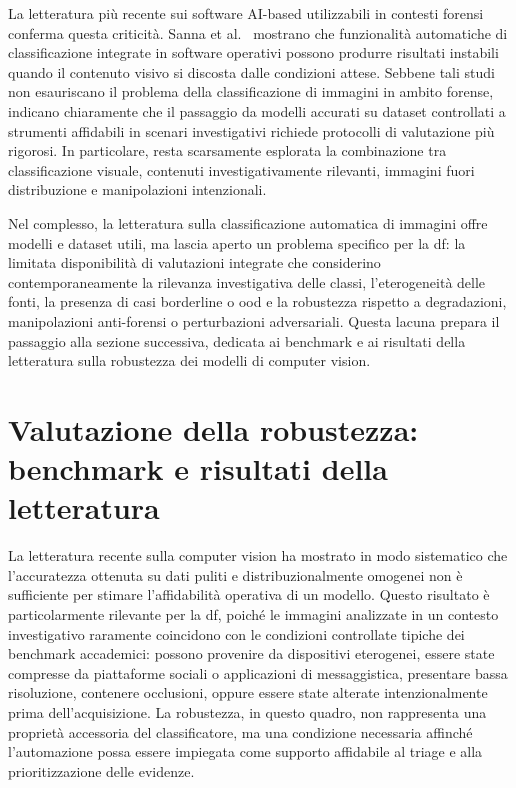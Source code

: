 La letteratura più recente sui software AI-based utilizzabili in contesti forensi conferma questa criticità. Sanna et al.~\cite{sanna2024preliminary} mostrano che funzionalità automatiche di classificazione integrate in software operativi possono produrre risultati instabili quando il contenuto visivo si discosta dalle condizioni attese. Sebbene tali studi non esauriscano il problema della classificazione di immagini in ambito forense, indicano chiaramente che il passaggio da modelli accurati su dataset controllati a strumenti affidabili in scenari investigativi richiede protocolli di valutazione più rigorosi. In particolare, resta scarsamente esplorata la combinazione tra classificazione visuale, contenuti investigativamente rilevanti, immagini fuori distribuzione e manipolazioni intenzionali.

Nel complesso, la letteratura sulla classificazione automatica di immagini offre modelli e dataset utili, ma lascia aperto un problema specifico per la \gls{df}: la limitata disponibilità di valutazioni integrate che considerino contemporaneamente la rilevanza investigativa delle classi, l'eterogeneità delle fonti, la presenza di casi borderline o \gls{ood} e la robustezza rispetto a degradazioni, manipolazioni anti-forensi o perturbazioni adversariali. Questa lacuna prepara il passaggio alla sezione successiva, dedicata ai benchmark e ai risultati della letteratura sulla robustezza dei modelli di computer vision.

\section{Valutazione della robustezza: benchmark e risultati della letteratura}
\label{sec:sota-robustness-benchmarks}

La letteratura recente sulla computer vision ha mostrato in modo sistematico che l'accuratezza ottenuta su dati puliti e distribuzionalmente omogenei non è sufficiente per stimare l'affidabilità operativa di un modello. Questo risultato è particolarmente rilevante per la \gls{df}, poiché le immagini analizzate in un contesto investigativo raramente coincidono con le condizioni controllate tipiche dei benchmark accademici: possono provenire da dispositivi eterogenei, essere state compresse da piattaforme sociali o applicazioni di messaggistica, presentare bassa risoluzione, contenere occlusioni, oppure essere state alterate intenzionalmente prima dell'acquisizione. La robustezza, in questo quadro, non rappresenta una proprietà accessoria del classificatore, ma una condizione necessaria affinché l'automazione possa essere impiegata come supporto affidabile al triage e alla prioritizzazione delle evidenze.

